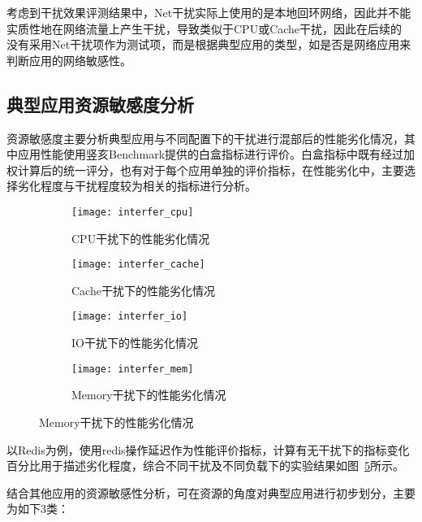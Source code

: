 考虑到干扰效果评测结果中，Net干扰实际上使用的是本地回环网络，因此并不能实质性地在网络流量上产生干扰，导致类似于CPU或Cache干扰，因此在后续的
没有采用Net干扰项作为测试项，而是根据典型应用的类型，如是否是网络应用来判断应用的网络敏感性。

\subsection{典型应用资源敏感度分析}

资源敏感度主要分析典型应用与不同配置下的干扰进行混部后的性能劣化情况，其中应用性能使用竖亥Benchmark提供的白盒指标进行评价。白盒指标中既有经过加权计算后的统一评分，也有对于每个应用单独的评价指标，在性能劣化中，主要选择劣化程度与干扰程度较为相关的指标进行分析。

\begin{figure}[H]
    \centering
    \begin{subfigure}[b]{0.45\textwidth}
        \texttt{[image: interfer\_cpu]}
        \caption{CPU干扰下的性能劣化情况}
        \label{fig:interfer_cpu}
    \end{subfigure}
    \begin{subfigure}[b]{0.45\textwidth}
      \texttt{[image: interfer\_cache]}
      \caption{Cache干扰下的性能劣化情况}
      \label{fig:interfer_cache}
    \end{subfigure}
    \begin{subfigure}[b]{0.45\textwidth}
        \texttt{[image: interfer\_io]}
        \caption{IO干扰下的性能劣化情况}
        \label{fig:interfer_io}
    \end{subfigure}
    \begin{subfigure}[b]{0.45\textwidth}
        \texttt{[image: interfer\_mem]}
        \caption{Memory干扰下的性能劣化情况}
        \label{fig:interfer_mem}
    \end{subfigure}
\label{fig:redis_interf_sensitivity}
\end{figure}

以Redis为例，使用redis操作延迟作为性能评价指标，计算有无干扰下的指标变化百分比用于描述劣化程度，综合不同干扰及不同负载下的实验结果如图~\ref{fig:redis_interf_sensitivity}所示。

结合其他应用的资源敏感性分析，可在资源的角度对典型应用进行初步划分，主要为如下3类：

